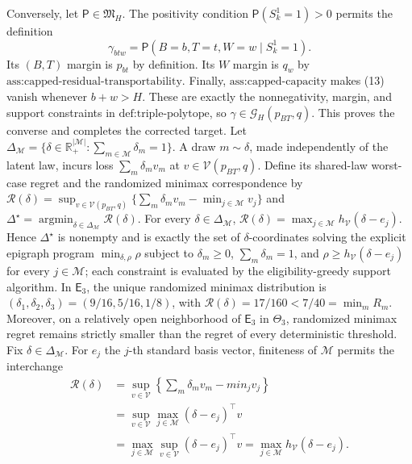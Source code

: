 Conversely, let \(\mathsf P\in\mathfrak M_H\). The positivity condition \(\mathsf P(S_k^1=1)>0\) permits the definition
\[
 \gamma_{btw}=\mathsf P(B=b,T=t,W=w\mid S_k^1=1).         \tag{13}
\]
Its \((B,T)\) margin is \(p_{bt}\) by definition. Its \(W\) margin is \(q_w\) by \(\text{ass:capped-residual-transportability}\). Finally, \(\text{ass:capped-capacity}\) makes (13) vanish whenever \(b+w>H\). These are exactly the nonnegativity, margin, and support constraints in \(\text{def:triple-polytope}\), so \(\gamma\in\mathcal G_H(p_{BT},q)\). This proves the converse and completes the corrected target.
Let \(\Delta_{\mathcal M}=\{\delta\in\mathbb R_+^{|\mathcal M|}:\sum_{m\in\mathcal M}\delta_m=1\}\). A draw \(m\sim\delta\), made independently of the latent law, incurs loss \(\sum_m\delta_m v_m\) at \(v\in\mathcal V(p_{BT},q)\). Define its shared-law worst-case regret and the randomized minimax correspondence by \(\mathcal R(\delta)=\sup_{v\in\mathcal V(p_{BT},q)}\{\sum_m\delta_m v_m-\min_{j\in\mathcal M}v_j\}\) and \(\Delta^\star=\operatorname*{argmin}_{\delta\in\Delta_{\mathcal M}}\mathcal R(\delta)\).
For every \(\delta\in\Delta_{\mathcal M}\), \(\mathcal R(\delta)=\max_{j\in\mathcal M}h_{\mathcal V}(\delta-e_j)\). Hence \(\Delta^\star\) is nonempty and is exactly the set of \(\delta\)-coordinates solving the explicit epigraph program \(\min_{\delta,\rho}\rho\) subject to \(\delta_m\ge0\), \(\sum_m\delta_m=1\), and \(\rho\ge h_{\mathcal V}(\delta-e_j)\) for every \(j\in\mathcal M\); each constraint is evaluated by the eligibility-greedy support algorithm. In \(\mathsf E_3\), the unique randomized minimax distribution is \((\delta_1,\delta_2,\delta_3)=(9/16,5/16,1/8)\), with \(\mathcal R(\delta)=17/160<7/40=\min_mR_m\). Moreover, on a relatively open neighborhood of \(\mathsf E_3\) in \(\Theta_3\), randomized minimax regret remains strictly smaller than the regret of every deterministic threshold.
Fix \(\delta\in\Delta_{\mathcal M}\). For \(e_j\) the \(j\)-th standard basis vector, finiteness of \(\mathcal M\) permits the interchange
\[
 \begin{aligned}
 \mathcal R(\delta)
 &=\sup_{v\in\mathcal V}\left\{\sum_m\delta_mv_m-min_jv_j\right\}\\
 &=\sup_{v\in\mathcal V}\max_{j\in\mathcal M}(\delta-e_j)^\top v\\
 &=\max_{j\in\mathcal M}\sup_{v\in\mathcal V}(\delta-e_j)^\top v
 =\max_{j\in\mathcal M}h_{\mathcal V}(\delta-e_j).
 \end{aligned}                                           \tag{1}
\]
